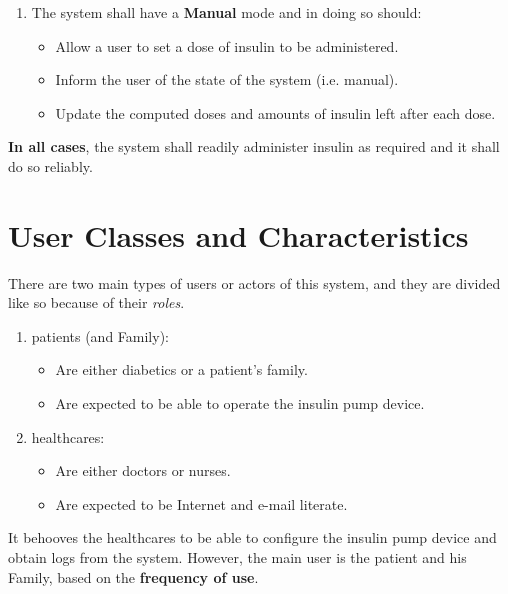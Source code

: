 \documentclass{scrreprt}
\begin{document}
\begin{enumerate}
\begin{itemize}
      \item Produce logs of computed doses and \gls{biomarkers} for \glspl{healthcare}.
      \item Produce alarms for \glspl{healthcare} in serious cases.
    \end{itemize}
  \item The system shall have a \textbf{Manual} mode and in doing so should:
    \begin{itemize}
      \item Allow a \gls{user} to set a dose of \gls{insulin} to be administered. 
      \item Inform the \gls{user} of the state of the system (i.e. manual).
      \item Update the computed doses and amounts of \gls{insulin} left after each dose.
    \end{itemize}
\end{enumerate}

\textbf{In all cases}, the system shall readily administer \gls{insulin} as required and it shall do so reliably.

\section{User Classes and Characteristics}
There are two main types of \glspl{user} or actors of this system, and they are divided like so because of their \textsl{roles}. 
\begin{enumerate}
  \item \Glspl{patient} (and Family):
    \begin{itemize}
      \item Are either diabetics or a \gls{patient}'s family.
      \item Are expected to be able to operate the insulin pump device.
    \end{itemize}
  \item \Glspl{healthcare}:
    \begin{itemize}
      \item Are either \glspl{doctor} or nurses.
      \item Are expected to be Internet and e-mail literate.
    \end{itemize}
\end{enumerate}

It behooves the \glspl{healthcare} to be able to configure the insulin pump device and obtain logs from the system. However, the main \gls{user} is the \gls{patient} and his Family, based on the \textbf{frequency of use}.
\end{document}
